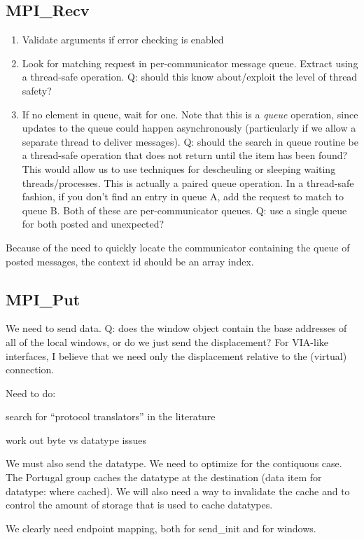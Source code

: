 \documentclass{article}
\begin{document}
\subsection{MPI\_Recv}
\begin{enumerate}
\item Validate arguments if error checking is enabled
\item Look for matching request in per-communicator message queue.  Extract
  using a thread-safe operation.  Q: should this know about/exploit the level
  of thread safety?
\item If no element in queue, wait for one.  Note that this is a \emph{queue}
  operation, since updates to the queue could happen asynchronously
  (particularly if we allow a separate thread to deliver messages).  Q: should
  the search in queue routine be a thread-safe operation that does not return
  until the item has been found?  This would allow us to use techniques for
  descheuling or sleeping waiting threads/processes.
  This is actually a paired queue operation.  In a thread-safe fashion, if you
  don't find an entry in queue A, add the request to match to queue B.  Both
  of these are per-communicator queues.  Q: use a single queue for both posted
  and unexpected?
\end{enumerate}

Because of the need to quickly locate the communicator containing the queue of
posted messages, the context id should be an array index.

\subsection{MPI\_Put}
We need to send data.  Q: does the window object contain the base addresses of
all of the local windows, or do we just send the displacement?  For VIA-like
interfaces, I believe that we need only the displacement relative to the
(virtual) connection.

Need to do:

search for ``protocol translators'' in the literature

work out byte vs datatype issues

We must also send the datatype.  We need to optimize for the contiquous case.
The Portugal group caches the datatype at the destination (data item for
datatype: where cached).  We will also need a way to invalidate the cache and
to control the amount of storage that is used to cache datatypes.

We clearly need endpoint mapping, both for send\_init and for windows.
\end{document}
